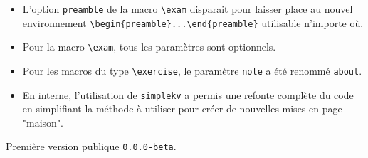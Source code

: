 \documentclass[12pt,a4paper]{scrartcl}
\begin{document}
\begin{description}[leftmargin=1em]
\begin{itemize}
        \item L'option \verb+preamble+ de la macro \verb+\exam+ disparait pour laisser place au nouvel environnement \verb+\begin{preamble}...\end{preamble}+ utilisable n'importe où.

        \item Pour la macro \verb+\exam+, tous les paramètres sont optionnels.

        \item Pour les macros du type \verb+\exercise+, le paramètre \verb+note+ a été renommé \verb+about+.

        \item En interne, l'utilisation de \verb+simplekv+ a permis une refonte complète du code en simplifiant la méthode à utiliser pour créer de nouvelles mises en page "maison".
    \end{itemize}


    \item[2017-11-03] Première version publique \verb+0.0.0-beta+.
\end{description}
\end{document}
